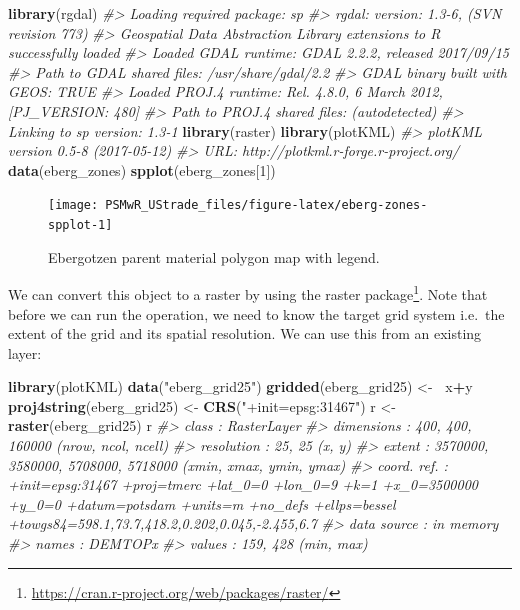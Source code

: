 \documentclass[graybox,natbib,nospthms,UStrade]{svmono}
\newenvironment{Shaded}{\begin{snugshade}}{\end{snugshade}}
\newcommand{\CommentTok}[1]{\textcolor[rgb]{0.37,0.37,0.37}{\textit{#1}}}
\newcommand{\DecValTok}[1]{\textcolor[rgb]{0.06,0.06,0.06}{#1}}
\newcommand{\ErrorTok}[1]{\textcolor[rgb]{0.14,0.14,0.14}{\textbf{#1}}}
\newcommand{\KeywordTok}[1]{\textcolor[rgb]{0.27,0.27,0.27}{\textbf{#1}}}
\newcommand{\NormalTok}[1]{#1}
\newcommand{\OperatorTok}[1]{\textcolor[rgb]{0.43,0.43,0.43}{\textbf{#1}}}
\newcommand{\StringTok}[1]{\textcolor[rgb]{0.5,0.5,0.5}{#1}}
\renewcommand{\href}[2]{#2 (\url{#1})}
\renewcommand{\href}[2]{#2\footnote{\url{#1}}}
\begin{document}
\begin{Shaded}
\begin{Highlighting}[]
\KeywordTok{library}\NormalTok{(rgdal)}
\CommentTok{#> Loading required package: sp}
\CommentTok{#> rgdal: version: 1.3-6, (SVN revision 773)}
\CommentTok{#>  Geospatial Data Abstraction Library extensions to R successfully loaded}
\CommentTok{#>  Loaded GDAL runtime: GDAL 2.2.2, released 2017/09/15}
\CommentTok{#>  Path to GDAL shared files: /usr/share/gdal/2.2}
\CommentTok{#>  GDAL binary built with GEOS: TRUE }
\CommentTok{#>  Loaded PROJ.4 runtime: Rel. 4.8.0, 6 March 2012, [PJ_VERSION: 480]}
\CommentTok{#>  Path to PROJ.4 shared files: (autodetected)}
\CommentTok{#>  Linking to sp version: 1.3-1}
\KeywordTok{library}\NormalTok{(raster)}
\KeywordTok{library}\NormalTok{(plotKML)}
\CommentTok{#> plotKML version 0.5-8 (2017-05-12)}
\CommentTok{#> URL: http://plotkml.r-forge.r-project.org/}
\KeywordTok{data}\NormalTok{(eberg_zones)}
\KeywordTok{spplot}\NormalTok{(eberg_zones[}\DecValTok{1}\NormalTok{])}
\end{Highlighting}
\end{Shaded}

\begin{figure}[H]

{\centering \texttt{[image: PSMwR\_UStrade\_files/figure-latex/eberg-zones-spplot-1]} 

}

\caption{Ebergotzen parent material polygon map with legend.}\label{fig:eberg-zones-spplot}
\end{figure}

We can convert this object to a raster by using the \href{https://cran.r-project.org/web/packages/raster/}{raster package}. Note that before we can run the operation, we need to know the target grid system i.e.~the extent of the grid and its spatial resolution. We can use this from an existing layer:

\begin{Shaded}
\begin{Highlighting}[]
\KeywordTok{library}\NormalTok{(plotKML)}
\KeywordTok{data}\NormalTok{(}\StringTok{"eberg_grid25"}\NormalTok{)}
\KeywordTok{gridded}\NormalTok{(eberg_grid25) <-}\StringTok{ }\ErrorTok{~}\NormalTok{x}\OperatorTok{+}\NormalTok{y}
\KeywordTok{proj4string}\NormalTok{(eberg_grid25) <-}\StringTok{ }\KeywordTok{CRS}\NormalTok{(}\StringTok{"+init=epsg:31467"}\NormalTok{)}
\NormalTok{r <-}\StringTok{ }\KeywordTok{raster}\NormalTok{(eberg_grid25)}
\NormalTok{r}
\CommentTok{#> class       : RasterLayer }
\CommentTok{#> dimensions  : 400, 400, 160000  (nrow, ncol, ncell)}
\CommentTok{#> resolution  : 25, 25  (x, y)}
\CommentTok{#> extent      : 3570000, 3580000, 5708000, 5718000  (xmin, xmax, ymin, ymax)}
\CommentTok{#> coord. ref. : +init=epsg:31467 +proj=tmerc +lat_0=0 +lon_0=9 +k=1 +x_0=3500000 +y_0=0 +datum=potsdam +units=m +no_defs +ellps=bessel +towgs84=598.1,73.7,418.2,0.202,0.045,-2.455,6.7 }
\CommentTok{#> data source : in memory}
\CommentTok{#> names       : DEMTOPx }
\CommentTok{#> values      : 159, 428  (min, max)}
\end{Highlighting}
\end{Shaded}
\end{document}
